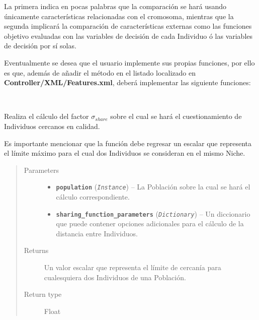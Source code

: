 \documentclass[letterpaper,10pt,english]{sphinxmanual}
\begin{document}
\begin{DUlineblock}{0em}
\item[] La primera indica en pocas palabras que la comparación se hará usando únicamente características relacionadas
con el cromosoma, mientras que la segunda implicará la comparación de características externas como las funciones objetivo
evaluadas con las variables de decisión de cada Individuo ó las variables de decisión por sí solas.
\item[] 
\item[] Eventualmente se desea que el usuario implemente sus propias funciones, por ello es que, además de añadir
el método en el listado localizado en \textbf{Controller/XML/Features.xml}, deberá implementar las siguiente funciones:
\end{DUlineblock}


\begin{fulllineitems}
~
\begin{DUlineblock}{0em}
\item[] Realiza el cálculo del factor \(\sigma_{share}\) sobre el cual se hará el cuestionamiento
de Individuos cercanos en calidad.
\item[] Es importante mencionar que la función debe regresar un escalar que representa el límite
máximo para el cual dos Individuos se consideran en el mismo Niche.
\end{DUlineblock}
\begin{quote}\begin{description}
\item[{Parameters}] \leavevmode\begin{itemize}
\item {} 
\textbf{\texttt{population}} (\emph{\texttt{Instance}}) -- La Población sobre la cual se hará el cálculo correspondiente.

\item {} 
\textbf{\texttt{sharing\_function\_parameters}} (\emph{\texttt{Dictionary}}) -- Un diccionario que puede contener opciones adicionales para
el cálculo de la distancia entre Individuos.

\end{itemize}

\item[{Returns}] \leavevmode
Un valor escalar que representa el límite de cercanía para cualesquiera dos Individuos
de una Población.

\item[{Return type}] \leavevmode
Float

\end{description}\end{quote}

\end{fulllineitems}
\end{document}
